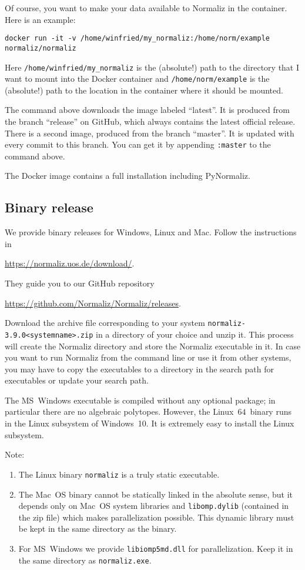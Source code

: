\documentclass[12pt,a4paper]{scrartcl}
\theoremstyle{definition}
\def\ttt{\texttt}
\def\version{3.9.0}
\def\NmzDir{normaliz-\version}
\begin{document}
Of course, you want to make your data available to Normaliz in the container. Here is an example:
\begin{Verbatim}
docker run -it -v /home/winfried/my_normaliz:/home/norm/example  normaliz/normaliz
\end{Verbatim}
Here \verb|/home/winfried/my_normaliz| is the (absolute!) path to the directory that I want to mount into the Docker container and \verb|/home/norm/example| is the (absolute!) path to the location in the container where it should be mounted.

The command above downloads the image labeled ``latest''. It is produced from the branch ``release'' on GitHub, which always contains the latest official release. There is a second image, produced from the branch ``master''. It is updated with every commit to this branch. You can get it by appending \verb|:master| to the command above.

The Docker image contains a full installation including PyNormaliz.

\subsection{Binary release}

We provide binary releases for Windows, Linux and Mac. Follow the instructions in
\begin{center}
	\url{https://normaliz.uos.de/download/}.
\end{center}
They guide you to our GitHub repository
\begin{center}
	\url{https://github.com/Normaliz/Normaliz/releases}.
\end{center}

Download the archive file
corresponding to your system \ttt{\NmzDir<systemname>.zip} in a directory of your choice
and unzip it. This process will create the Normaliz directory and store the Normaliz executable in it. In case you want to run Normaliz from the
command line or use it from other systems, you may have to copy
the executables to a directory in the search path for executables or update your search path.

The MS~Windows executable is compiled without any optional package; in particular there are no algebraic polytopes. However, the Linux~$64$~binary runs in the Linux subsystem of Windows~10. It is extremely easy to install the Linux subsystem.

Note:
\begin{enumerate}
	\item The Linux binary \verb|normaliz| is a truly static executable.
	
	\item The Mac~OS binary cannot be statically linked in the absolute sense, but it depends only on Mac~OS system libraries and \verb|libomp.dylib| (contained in the zip file) which makes parallelization possible. This dynamic library must be kept in the same directory as the binary.
	
	\item For MS~Windows we provide \verb|libiomp5md.dll| for parallelization. Keep it in the same directory as \verb|normaliz.exe|.
\end{enumerate}
\end{document}
